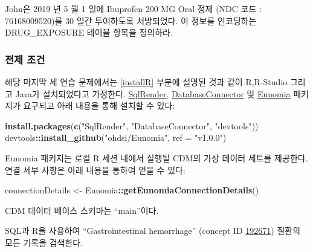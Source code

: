 \documentclass[11pt]{book}
\newenvironment{Shaded}{\begin{snugshade}}{\end{snugshade}}
\newcommand{\KeywordTok}[1]{\textcolor[rgb]{0.13,0.29,0.53}{\textbf{#1}}}
\newcommand{\DataTypeTok}[1]{\textcolor[rgb]{0.13,0.29,0.53}{#1}}
\newcommand{\StringTok}[1]{\textcolor[rgb]{0.31,0.60,0.02}{#1}}
\newcommand{\OperatorTok}[1]{\textcolor[rgb]{0.81,0.36,0.00}{\textbf{#1}}}
\newcommand{\NormalTok}[1]{#1}
\theoremstyle{definition}
\theoremstyle{definition}
\theoremstyle{definition}
\theoremstyle{remark}
\let\BeginKnitrBlock\begin \let\EndKnitrBlock\end
\begin{document}
\BeginKnitrBlock{exercise}
\protect\hypertarget{exr:exerciseJohnDrug}{}{\label{exr:exerciseJohnDrug}
}John은 2019 년 5 월 1 일에 Ibuprofen 200 MG Oral 정제 (NDC 코드 :
76168009520)를 30 일간 투여하도록 처방되었다. 이 정보를 인코딩하는
DRUG\_EXPOSURE 테이블 항목을 정의하라.
\EndKnitrBlock{exercise}

\subsubsection*{전제 조건}\label{--1}

해당 마지막 세 연습 문제에서는 \ref{installR} 부분에 설명된 것과 같이
R,R-Studio 그리고 Java가 설치되었다고 가정한다.
\href{https://ohdsi.github.io/SqlRender/}{SqlRender},
\href{https://ohdsi.github.io/DatabaseConnector/}{DatabaseConnector} 및
\href{https://ohdsi.github.io/Eunomia/}{Eunomia} 패키지가 요구되고 아래
내용을 통해 설치할 수 있다:

\begin{Shaded}
\begin{Highlighting}[]
\KeywordTok{install.packages}\NormalTok{(}\KeywordTok{c}\NormalTok{(}\StringTok{"SqlRender"}\NormalTok{, }\StringTok{"DatabaseConnector"}\NormalTok{, }\StringTok{"devtools"}\NormalTok{))}
\NormalTok{devtools}\OperatorTok{::}\KeywordTok{install_github}\NormalTok{(}\StringTok{"ohdsi/Eunomia"}\NormalTok{, }\DataTypeTok{ref =} \StringTok{"v1.0.0"}\NormalTok{)}
\end{Highlighting}
\end{Shaded}

Eunomia 패키지는 로컬 R 세션 내에서 실행될 CDM의 가상 데이터 세트를
제공한다. 연결 세부 사항은 아래 내용을 통하여 얻을 수 있다:

\begin{Shaded}
\begin{Highlighting}[]
\NormalTok{connectionDetails <-}\StringTok{ }\NormalTok{Eunomia}\OperatorTok{::}\KeywordTok{getEunomiaConnectionDetails}\NormalTok{()}
\end{Highlighting}
\end{Shaded}

CDM 데이터 베이스 스키마는 ``main''이다.

\BeginKnitrBlock{exercise}
\protect\hypertarget{exr:exerciseGiBleedRecords}{}{\label{exr:exerciseGiBleedRecords}
}SQL과 R을 사용하여 ``Gastrointestinal hemorrhage'' (concept ID
\href{http://athena.ohdsi.org/search-terms/terms/192671}{192671}) 질환의
모든 기록을 검색한다.
\EndKnitrBlock{exercise}
\end{document}
